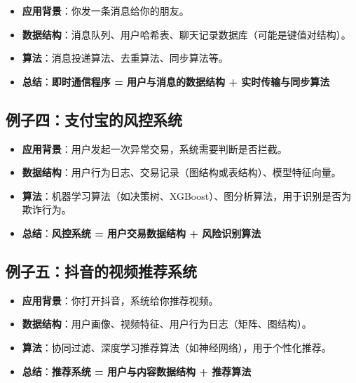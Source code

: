 \documentclass{article}
\begin{document}
\begin{itemize}
    \item \textbf{应用背景}：你发一条消息给你的朋友。
    \item \textbf{数据结构}：消息队列、用户哈希表、聊天记录数据库（可能是键值对结构）。
    \item \textbf{算法}：消息投递算法、去重算法、同步算法等。
    \item \textbf{总结}：\textbf{即时通信程序 = 用户与消息的数据结构 + 实时传输与同步算法}
\end{itemize}

\subsection*{例子四：支付宝的风控系统}

\begin{itemize}
    \item \textbf{应用背景}：用户发起一次异常交易，系统需要判断是否拦截。
    \item \textbf{数据结构}：用户行为日志、交易记录（图结构或表结构）、模型特征向量。
    \item \textbf{算法}：机器学习算法（如决策树、XGBoost）、图分析算法，用于识别是否为欺诈行为。
    \item \textbf{总结}：\textbf{风控系统 = 用户交易数据结构 + 风险识别算法}
\end{itemize}

\subsection*{例子五：抖音的视频推荐系统}

\begin{itemize}
    \item \textbf{应用背景}：你打开抖音，系统给你推荐视频。
    \item \textbf{数据结构}：用户画像、视频特征、用户行为日志（矩阵、图结构）。
    \item \textbf{算法}：协同过滤、深度学习推荐算法（如神经网络），用于个性化推荐。
    \item \textbf{总结}：\textbf{推荐系统 = 用户与内容数据结构 + 推荐算法}
\end{itemize}
\end{document}
